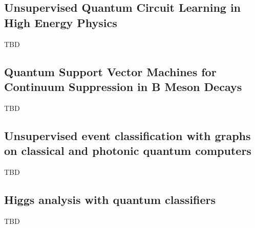 \subsection{Unsupervised Quantum Circuit Learning in High Energy Physics~\cite{Delgado:2022aty}}
TBD
\subsection{Quantum Support Vector Machines for Continuum Suppression in B Meson Decays~\cite{Heredge:2021vww}}
TBD
\subsection{Unsupervised event classification with graphs on classical and photonic quantum computers~\cite{Blance:2020ktp}}
TBD
\subsection{Higgs analysis with quantum classifiers~\cite{Belis:2021zqi}}
TBD


